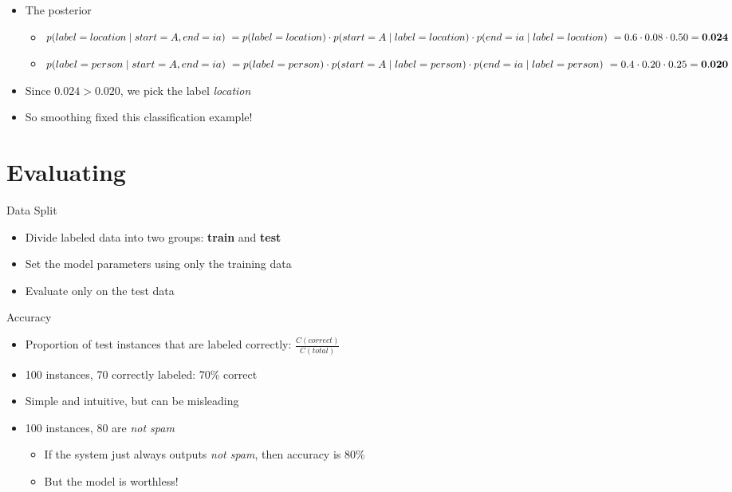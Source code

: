\documentclass[11pt,letterpaper]{article}
\begin{document}
\begin{itemize}
\begin{itemize}
    \end{itemize}


  \item The posterior
    \begin{itemize}
      \item $p(label=location \mid start=A, end=ia) \\
            ~ = p(label=location) \cdot p(start=A \mid label=location) \cdot p(end=ia \mid label=location) \\
            ~ = 0.6 \cdot 0.08 \cdot 0.50 = \mathbf{0.024}$
      \item $p(label=person \mid start=A, end=ia) \\
            ~ = p(label=person) \cdot p(start=A \mid label=person) \cdot p(end=ia \mid label=person) \\
            ~ = 0.4 \cdot 0.20 \cdot 0.25 = \mathbf{0.020}$
    \end{itemize}
  \item Since $0.024 > 0.020$, we pick the label \textit{location}
  \item So smoothing fixed this classification example!
\end{itemize}




\section{Evaluating}

Data Split

\begin{itemize}
  \item Divide labeled data into two groups: \textbf{train} and \textbf{test}
  \item Set the model parameters using only the training data
  \item Evaluate only on the test data
\end{itemize}


Accuracy

\begin{itemize}
  \item Proportion of test instances that are labeled correctly: $\frac{C(correct)}{C(total)}$
  \item 100 instances, 70 correctly labeled: 70\% correct
  \item Simple and intuitive, but can be misleading
  \item 100 instances, 80 are \textit{not spam}
    \begin{itemize}
      \item If the system just always outputs \textit{not spam}, then accuracy is 80\%
      \item But the model is worthless!
    \end{itemize}
\end{itemize}
\end{document}
